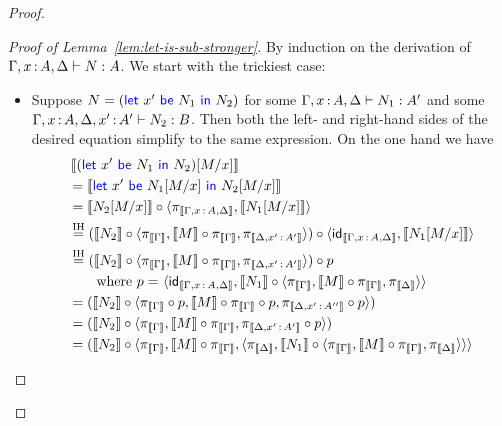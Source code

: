 \begin{proof}
  \begin{proof}[Proof of Lemma~\ref{lem:let-is-sub-stronger}]
    By induction on the derivation of \(\Gamma,x\ofty A,\Delta\vdash N : A\).
    We start with the trickiest case:
    \begin{itemize}
    \item Suppose \(N = (\pllet{x'}{N_1}{N_2})\) for some \(\Gamma,x\ofty A,\Delta\vdash N_1 : A'\)
      and some \(\Gamma,x\ofty A,\Delta,x'\ofty A' \vdash N_2 : B\).
      Then both the left- and right-hand sides of the desired equation simplify to the same expression.
      On the one hand we have
      \begin{align*}
        &\llbr{(\pllet{x'}{N_1}{N_2})[M/x]}
        \\
        &=
        \llbr{\pllet{x'}{N_1[M/x]}{N_2[M/x]}}
        \\
        &=
        \llbr{N_2[M/x]} \circ \angled{\pi_{\llbr{\Gamma,x\ofty A,\Delta}}, \llbr{N_1[M/x]}}
        \\
        &\stackrel{\text{IH}}=
        (\llbr{N_2} \circ \angled{\pi_{\llbr{\Gamma}},\llbr{M}\circ \pi_{\llbr{\Gamma}},\pi_{\llbr{\Delta,x'\ofty A'}}})
        \circ \angled{\idt_{\llbr{\Gamma,x\ofty A,\Delta}}, \llbr{N_1[M/x]}}
        \\
        &\stackrel{\text{IH}}=
        (\llbr{N_2} \circ \angled{\pi_{\llbr{\Gamma}},\llbr{M}\circ \pi_{\llbr{\Gamma}},\pi_{\llbr{\Delta,x'\ofty A'}}})
        \circ p
        \\
        &\qquad\text{where \(p =\) }
        \angled{\idt_{\llbr{\Gamma,x\ofty A,\Delta}},
          \llbr{N_1} \circ
          \angled{
            \pi_{\llbr{\Gamma}},
            \llbr{M} \circ \pi_{\llbr{\Gamma}},
            \pi_{\llbr{\Delta}}
            }}
        \\
        &=
        (\llbr{N_2} \circ \angled{\pi_{\llbr{\Gamma}} \circ p,\llbr{M}\circ \pi_{\llbr{\Gamma}} \circ p,\pi_{\llbr{\Delta,x'\ofty A''}} \circ p})
        \\
        &=
        (\llbr{N_2} \circ \angled{\pi_{\llbr{\Gamma}},\llbr{M}\circ \pi_{\llbr{\Gamma}},\pi_{\llbr{\Delta,x'\ofty A'}} \circ p})
        \\
        &=
        (\llbr{N_2} \circ
        \angled{\pi_{\llbr{\Gamma}},\llbr{M}\circ \pi_{\llbr{\Gamma}},\angled{\pi_{\llbr{\Delta}}, \llbr{N_1}
          \circ \angled{
            \pi_{\llbr{\Gamma}},
            \llbr{M} \circ \pi_{\llbr{\Gamma}},
            \pi_{\llbr{\Delta}}
            }}}
      \end{align*}

\end{itemize}
\end{proof}
\end{proof}
